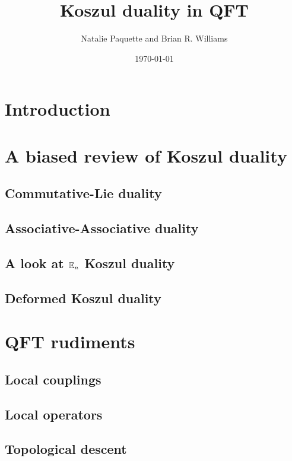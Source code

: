 \documentclass[11pt]{amsart}
\author{Natalie Paquette and Brian R. Williams}
\date{\today}
\title{Koszul duality in QFT}
\begin{document}
\maketitle

\section{Introduction}

\section{A biased review of Koszul duality} 


\subsection{Commutative-Lie duality}


\subsection{Associative-Associative duality} 


\subsection{A look at $\mathbb E_n$ Koszul duality}

\subsection{Deformed Koszul duality}

\section{QFT rudiments}

\subsection{Local couplings} 

\subsection{Local operators}

\subsection{Topological descent} 
\end{document}
